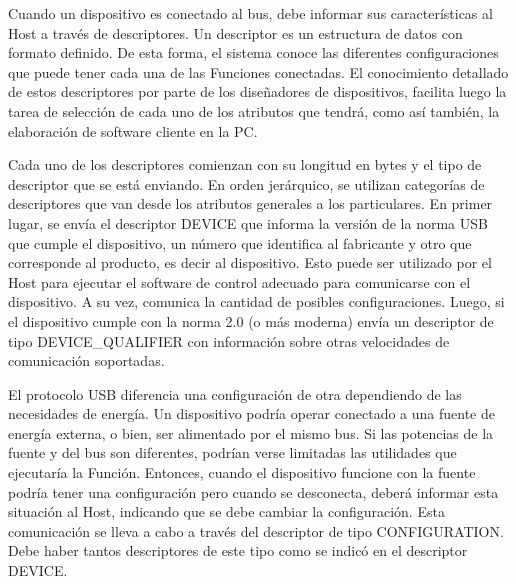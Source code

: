 %

Cuando un dispositivo es conectado al bus, debe informar sus características al Host a través de descriptores. Un descriptor es un estructura de datos con formato definido. De esta forma, el sistema conoce las diferentes configuraciones que puede tener cada una de las Funciones conectadas. El conocimiento detallado de estos descriptores por parte de los diseñadores de dispositivos, facilita luego la tarea de selección de cada uno de los atributos que tendrá, como así también, la elaboración de software cliente en la PC.%

Cada uno de los descriptores comienzan con su longitud en bytes y el tipo de descriptor que se está enviando. En orden jerárquico, se utilizan categorías de descriptores que van desde los atributos generales a los particulares. En primer lugar, se envía el descriptor DEVICE que informa la versión de la norma USB que cumple el dispositivo, un número que identifica al fabricante y otro que corresponde al producto, es decir al dispositivo. Esto puede ser utilizado por el Host para ejecutar el software de control adecuado para comunicarse con el dispositivo. A su vez, comunica la cantidad de posibles configuraciones. Luego, si el dispositivo cumple con la norma 2.0 (o más moderna) envía un descriptor de tipo DEVICE\_QUALIFIER con información sobre otras velocidades de comunicación soportadas.%

El protocolo USB diferencia una configuración de otra dependiendo de las necesidades de energía. Un dispositivo podría operar conectado a una fuente de energía externa, o bien, ser alimentado por el mismo bus. Si las potencias de la fuente y del bus son diferentes, podrían verse limitadas las utilidades que ejecutaría la Función. Entonces, cuando el dispositivo funcione con la fuente podría tener una configuración pero cuando se desconecta, deberá informar esta situación al Host, indicando que se debe cambiar la configuración. Esta comunicación se lleva a cabo a través del descriptor de tipo CONFIGURATION. Debe haber tantos descriptores de este tipo como se indicó en el descriptor DEVICE.%


